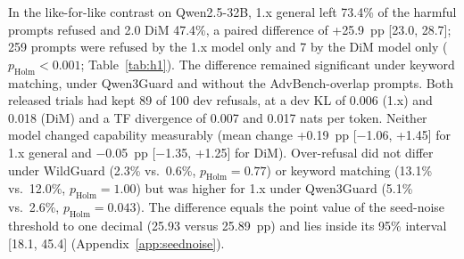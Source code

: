 In the like-for-like contrast on Qwen2.5-32B, 1.x general left 73.4\% of the harmful prompts refused and 2.0 DiM
47.4\%, a paired difference of +25.9~pp [23.0, 28.7]; 259 prompts were refused by the 1.x model only and 7 by the
DiM model only ($p_\mathrm{Holm}<0.001$; Table~\ref{tab:h1}). The difference remained significant under keyword
matching, under Qwen3Guard and without the AdvBench-overlap prompts. Both released trials had kept 89 of 100 dev
refusals, at a dev KL of 0.006 (1.x) and 0.018 (DiM) and a TF divergence of 0.007 and 0.017 nats per token. Neither
model changed capability measurably (mean change +0.19~pp [$-$1.06, +1.45] for 1.x general and $-$0.05~pp
[$-$1.35, +1.25] for DiM). Over-refusal did not differ under WildGuard (2.3\% vs.\ 0.6\%, $p_\mathrm{Holm}=0.77$)
or keyword matching (13.1\% vs.\ 12.0\%, $p_\mathrm{Holm}=1.00$) but was higher for 1.x under Qwen3Guard (5.1\% vs.\
2.6\%, $p_\mathrm{Holm}=0.043$). The difference equals the point value of the seed-noise threshold to one decimal (25.93
versus 25.89~pp) and lies inside its 95\% interval [18.1, 45.4] (Appendix~\ref{app:seednoise}).


